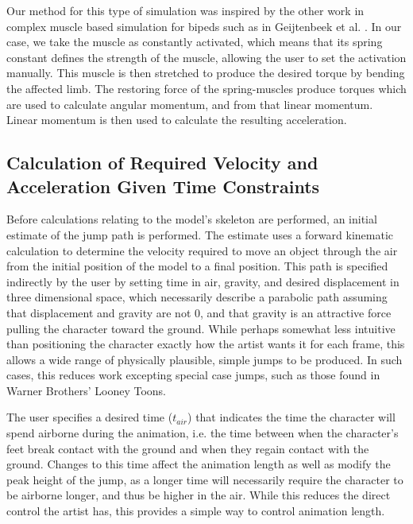Our method for this type of simulation was inspired by the other work in complex muscle based simulation for bipeds such as in Geijtenbeek et al. \cite{muscle_based_bipeds}.  In our case, we take the muscle as constantly activated, which means that its spring constant defines the strength of the muscle, allowing the user to set the activation manually.  This muscle is then stretched to produce the desired torque by bending the affected limb.  The restoring force of the spring-muscles produce torques which are used to calculate angular momentum, and from that linear momentum.  Linear momentum is then used to calculate the resulting acceleration.

\subsection{Calculation of Required Velocity and Acceleration Given Time Constraints}
\label{subsection:torque_path}
%	

Before calculations relating to the model's skeleton are performed, an initial estimate of the jump path is performed.  The estimate uses a forward kinematic calculation to determine the velocity required to move an object through the air from the initial position of the model to a final position.  This path is specified indirectly by the user by setting time in air, gravity, and desired displacement in three dimensional space, which necessarily describe a parabolic path assuming that displacement and gravity are not 0, and that gravity is an attractive force pulling the character toward the ground.  While perhaps somewhat less intuitive than positioning the character exactly how the artist wants it for each frame, this allows a wide range of physically plausible, simple jumps to be produced.  In such cases, this reduces work excepting special case jumps, such as those found in Warner Brothers' Looney Toons.

The user specifies a desired time ($t_{air}$) that indicates the time the character will spend airborne during the animation, i.e. the time between when the character's feet break contact with the ground and when they regain contact with the ground.  Changes to this time affect the animation length as well as modify the peak height of the jump, as a longer time will necessarily require the character to be airborne longer, and thus be higher in the air.  While this reduces the direct control the artist has, this provides a simple way to control animation length.

